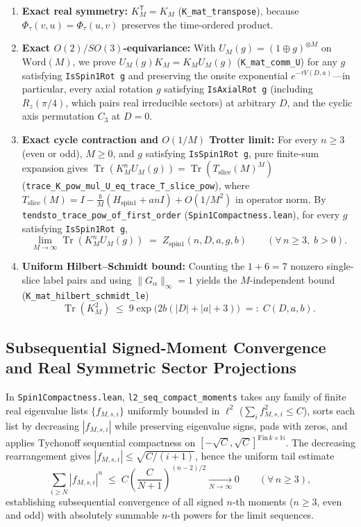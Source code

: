 \documentclass[11pt,a4paper]{article}
\newcommand{\id}[1]{{\small\nolinkurl{#1}}}
\newcommand{\Tr}{\operatorname{Tr}}
\newcommand{\N}{\mathbb{N}}
\begin{document}
\begin{enumerate}[leftmargin=1.8em,itemsep=2pt]
  \item \textbf{Exact real symmetry:} $K_M^\mathsf{T} = K_M$ (\id{K_mat_transpose}), because $\Phi_\tau(v, u) = \Phi_\tau(u, v)$ preserves the time-ordered product.
  \item \textbf{Exact $O(2)/SO(3)$-equivariance:} With $U_M(g) = (1 \oplus g)^{\otimes M}$ on $\mathrm{Word}(M)$, we prove $U_M(g) K_M = K_M U_M(g)$ (\id{K_mat_comm_U}) for any $g$ satisfying \id{IsSpin1Rot g} and preserving the onsite exponential $e^{-\tau V(D, a)}$---in particular, every axial rotation $g$ satisfying \id{IsAxialRot g} (including $R_z(\pi/4)$, which pairs real irreducible sectors) at arbitrary $D$, and the cyclic axis permutation $C_3$ at $D = 0$.
  \item \textbf{Exact cycle contraction and $O(1/M)$ Trotter limit:} For every $n \ge 3$ (even or odd), $M \ge 0$, and $g$ satisfying \id{IsSpin1Rot g}, pure finite-sum expansion gives $\Tr(K_M^n U_M(g)) = \Tr(T_{\mathrm{slice}}(M)^M)$ (\id{trace_K_pow_mul_U_eq_trace_T_slice_pow}), where $T_{\mathrm{slice}}(M) = I - \frac{b}{M}(H_{\mathrm{spin1}} + a n I) + O(1/M^2)$ in operator norm. By \id{tendsto_trace_pow_of_first_order} (\id{Spin1Compactness.lean}), for every $g$ satisfying \id{IsSpin1Rot g},
  \[
    \lim_{M \to \infty} \Tr(K_M^n U_M(g)) \;=\; Z_{\mathrm{spin1}}(n, D, a, g, b) \qquad (\forall\, n \ge 3,\; b > 0).
  \]
  \item \textbf{Uniform Hilbert--Schmidt bound:} Counting the $1 + 6 = 7$ nonzero single-slice label pairs and using $\|G_\alpha\|_\infty = 1$ yields the $M$-independent bound (\id{K_mat_hilbert_schmidt_le})
  \[
    \Tr(K_M^2) \;\le\; 9 \exp\!\big(2 b (|D| + |a| + 3)\big) \;=:\; C(D, a, b).
  \]
\end{enumerate}

\subsection{Subsequential Signed-Moment Convergence and Real Symmetric Sector Projections}
In \id{Spin1Compactness.lean}, \id{l2_seq_compact_moments} takes any family of finite real eigenvalue lists $\{f_{M, s, i}\}$ uniformly bounded in $\ell^2$ ($\sum_i f_{M,s,i}^2 \le C$), sorts each list by decreasing $|f_{M,s,i}|$ while preserving eigenvalue signs, pads with zeros, and applies Tychonoff sequential compactness on $[-\sqrt{C}, \sqrt{C}]^{\mathrm{Fin}\,k \times \N}$.
The decreasing rearrangement gives $|f_{M,s,i}| \le \sqrt{C/(i+1)}$, hence the uniform tail estimate
\[
  \sum_{i \ge N} |f_{M,s,i}|^n \;\le\; C \left(\frac{C}{N+1}\right)^{(n-2)/2} \xrightarrow[N \to \infty]{} 0 \qquad (\forall\, n \ge 3),
\]
establishing subsequential convergence of all signed $n$-th moments ($n \ge 3$, even and odd) with absolutely summable $n$-th powers for the limit sequences.
\end{document}
